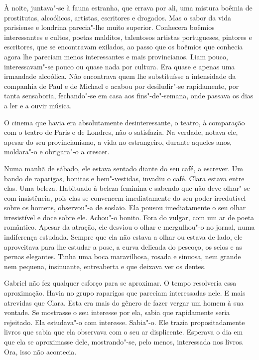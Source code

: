 À noite, juntava"-se à fauna estranha, que errava por ali, uma mistura
boêmia de prostitutas, alcoólicos, artistas, escritores e drogados. Mas
o sabor da vida parisiense e londrina parecia"-lhe muito superior.
Conhecera boêmios interessantes e cultos, poetas malditos, talentosos
artistas portugueses, pintores e escritores, que se encontravam
exilados, ao passo que os boêmios que conhecia agora lhe pareciam menos
interessantes e mais provincianos. Liam pouco, interessavam"-se pouco ou
quase nada por cultura. Era quase e apenas uma irmandade alcoólica. Não
encontrava quem lhe substituísse a intensidade da companhia de Paul e de
Michael e acabou por desiludir"-se rapidamente, por tanta sensaboria,
fechando"-se em casa aos fins"-de"-semana, onde passava os dias a ler e a
ouvir música.

O cinema que havia era absolutamente desinteressante, o teatro, à
comparação com o teatro de Paris e de Londres, não o satisfazia. Na
verdade, notava ele, apesar do seu provincianismo, a vida no
estrangeiro, durante aqueles anos, moldara"-o e obrigara"-o a crescer.

Numa manhã de sábado, ele estava sentado diante do seu café, a escrever.
Um bando de raparigas, bonitas e bem"-vestidas, invadiu o café. Clara
estava entre elas. Uma beleza. Habituado à beleza feminina e sabendo que
não deve olhar"-se com insistência, pois elas se convencem imediatamente
do seu poder irredutível sobre os homens, observou"-a de soslaio. Ela
pousou imediatamente o seu olhar irresistível e doce sobre ele. Achou"-o
bonito. Fora do vulgar, com um ar de poeta romântico. Apesar da
atração, ele desviou o olhar e mergulhou"-o no jornal, numa indiferença
estudada. Sempre que ela não estava a olhar ou estava de lado, ele
aproveitava para lhe estudar a pose, a curva delicada do pescoço, os
seios e as pernas elegantes. Tinha uma boca maravilhosa, rosada e
sinuosa, nem grande nem pequena, insinuante, entreaberta e que deixava
ver os dentes.

Gabriel não fez qualquer esforço para se aproximar. O tempo resolveria
essa aproximação. Havia no grupo raparigas que pareciam interessadas
nele. E mais atrevidas que Clara. Esta era mais do gênero de fazer
vergar um homem à sua vontade. Se mostrasse o seu interesse por ela,
sabia que rapidamente seria rejeitado. Ela estudava"-o com interesse.
Sabia"-o. Ele trazia propositadamente livros que sabia que ela observava
com o seu ar displicente. Esperava o dia em que ela se aproximasse dele,
mostrando"-se, pelo menos, interessada nos livros. Ora, isso não
acontecia.

